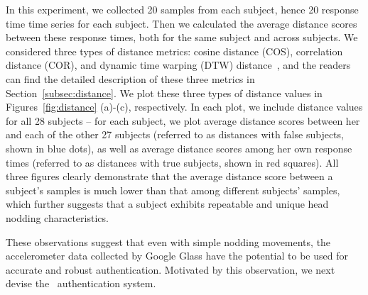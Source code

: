 In this experiment, we collected 20 samples from each subject, hence 20 response time time series for each subject. Then we calculated the average distance scores between these response times, both for the same subject and across subjects. We considered three types of distance metrics: cosine distance (COS), correlation distance (COR), and dynamic time warping (DTW) distance~\cite{dtw}, and the readers can find the detailed description of these three metrics in Section~\ref{subsec:distance}. We plot these three types of distance values in Figures~\ref{fig:distance} (a)-(c), respectively. In each plot, we include distance values for all 28 subjects -- for each subject, we plot average distance scores between her and each of the other 27 subjects (referred to as distances with false subjects, shown in blue dots), as well as average distance scores among her own response times (referred to as distances with true subjects, shown in red squares). All three figures clearly demonstrate that the average distance score between a subject's samples is much lower than that among different subjects' samples, which further suggests that a subject exhibits repeatable and unique head nodding characteristics.


These observations suggest that even with simple nodding movements, the accelerometer data collected by Google Glass have the potential to be used for accurate and robust authentication. Motivated by this observation, we next devise the \systemname~authentication system.

